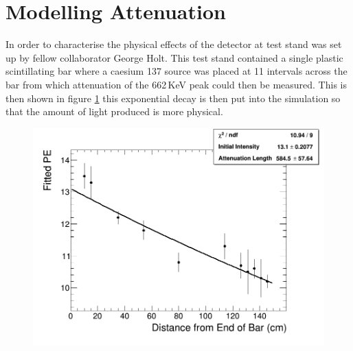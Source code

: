 \section{Modelling Attenuation}\label{sec:geant4Simulation_ModellingAttenuation}
In order to characterise the physical effects of the detector at test stand was set up by fellow collaborator George Holt. This test stand contained a single plastic scintillating bar where a caesium 137 source was placed at 11 intervals across the bar from which attenuation of the 662\,KeV peak could then be measured. This is then shown in figure \ref{fig:attenuationPlot} this exponential decay is then put into the simulation so that the amount of light produced is more physical. 
\begin{figure}[htbp]
 \centering
 \includegraphics[width=1.0\linewidth]{result_from_attnPlotter.png} 
 \label{fig:attenuationPlot}
\end{figure}

